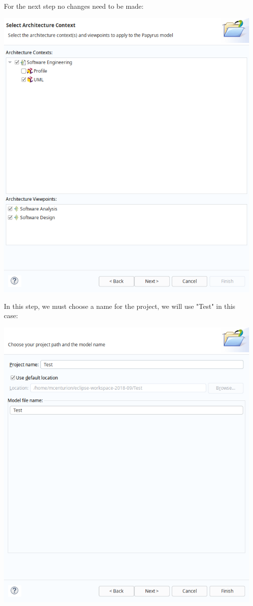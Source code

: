 \documentclass[11pt]{article}
\begin{document}
For the next step no changes need to be made:

\begin{center}
\includegraphics[width=.9\linewidth]{images/project_3.png}
\end{center}
\newpage

In this step, we must choose a name for the project, we will use "Test" in this case:

\begin{center}
\includegraphics[width=.9\linewidth]{images/project_4.png}
\end{center}
\newpage
\end{document}
